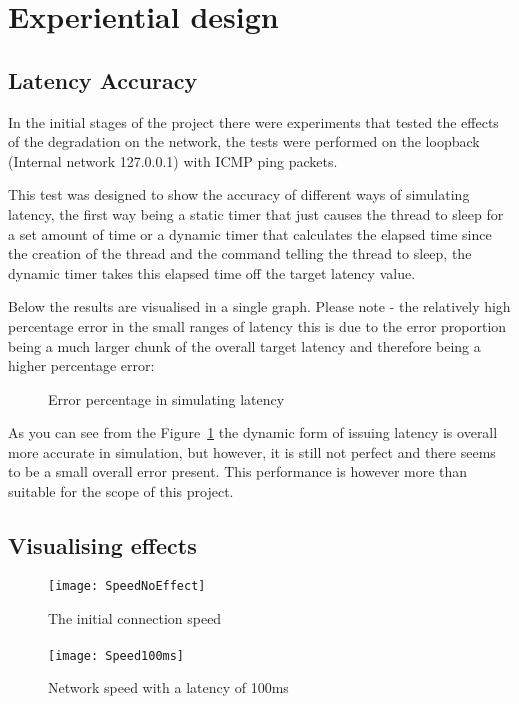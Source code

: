 %
\section{Experiential design}
\subsection{Latency Accuracy}
In the initial stages of the project there were experiments that tested the effects of the degradation on the network, the tests were performed on the loopback (Internal network 127.0.0.1) with ICMP ping packets.

This test was designed to show the accuracy of different ways of simulating latency, the first way being a static timer that just causes the thread to sleep for a set amount of time or a dynamic timer that calculates the elapsed time since the creation of the thread and the command telling the thread to sleep, the dynamic timer takes this elapsed time off the target latency value.

Below the results are visualised in a single graph. Please note - the relatively high percentage error in the small ranges of latency this is due to the error proportion being a much larger chunk of the overall target latency and therefore being a higher percentage error:

\begin{center}
	
	\begin{figure}[h]
		\caption{Error percentage in simulating latency}
		\label{ref:latencyAccuracy}
	\end{figure}
\end{center}


As you can see from the Figure~\ref{ref:latencyAccuracy} the dynamic form of issuing latency is overall more accurate in simulation, but however, it is still not perfect and there seems to be a small overall error present. This performance is however more than suitable for the scope of this project.

\subsection{Visualising effects}
\begin{wrapfigure}{r}{5cm}
	\texttt{[image: SpeedNoEffect]}
	\caption{The initial connection speed}
	\paragraph{}
	\texttt{[image: Speed100ms]}
	\caption{Network speed with a latency of 100ms}
\end{wrapfigure}

